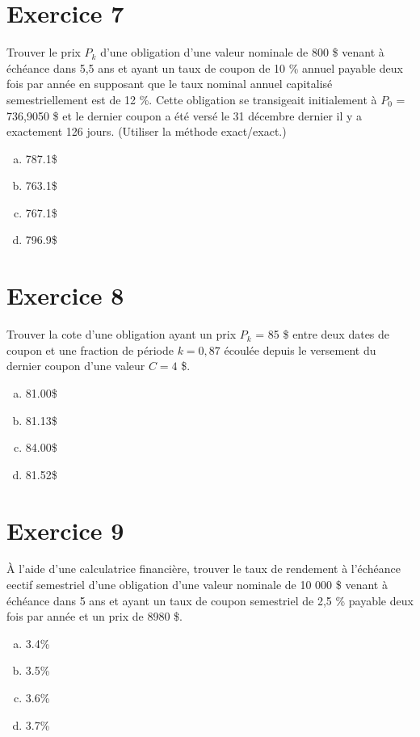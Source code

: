 \documentclass[10pt,a4paper]{article}
\begin{document}
\section*{Exercice 7}
Trouver le prix $P_k$ d’une obligation d’une valeur nominale de 800 \$ venant à échéance dans 5,5 ans et ayant un taux de coupon de 10 \% annuel payable deux fois par année en supposant que le taux nominal annuel capitalisé semestriellement est de 12 \%.  Cette obligation se transigeait initialement à $P_0$ = 736,9050 \$ et le dernier coupon a été versé le 31 décembre dernier il y a exactement 126 jours. (Utiliser la méthode exact/exact.)

\begin{enumerate}[a)]
\item 787.1\$
\item 763.1\$
\item 767.1\$
\item 796.9\$
\end{enumerate}

\newpage
\section*{Exercice 8}
Trouver la cote d'une obligation ayant un prix $P_k$ = 85 \$ entre deux dates de coupon et une fraction de période $k = 0,87$ écoulée depuis le versement du dernier coupon d'une valeur $C = 4$ \$.

\begin{enumerate}[a)]
\item 81.00\$
\item 81.13\$
\item 84.00\$
\item 81.52\$
\end{enumerate}

\section*{Exercice 9}
À l'aide d'une calculatrice financière, trouver le taux de rendement à l’échéance eectif semestriel d’une obligation d’une valeur nominale de 10 000 \$ venant à échéance dans 5 ans et ayant un taux de coupon semestriel de 2,5 \% payable deux fois par année et un prix de 8980 \$.

\begin{enumerate}[a)]
\item 3.4\%
\item 3.5\%
\item 3.6\%
\item 3.7\%
\end{enumerate}
\end{document}
